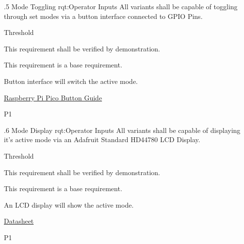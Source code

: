 \ONERQMTVKPP
{\RqtNumberBase.5}
{\ThisSys Mode Toggling}
{rqt:Operator Inputs}
{All \ThisSys variants shall be capable of toggling through set modes via a button interface connected to GPIO Pins.}
{
	\item [All Phases] Threshold
}
{This requirement shall be verified by demonstration.}
{
	\item [N/A] This requirement is a base requirement.
}
{
  \item Button interface will switch the active \GCS mode.
  \item \item \href{https://projects.raspberrypi.org/en/projects/introduction-to-the-pico/10}{Raspberry Pi Pico Button Guide}
}
{P1}

\ONERQMTVKPP
{\RqtNumberBase.6}
{\ThisSys Mode Display}
{rqt:Operator Inputs}
{All \ThisSys variants shall be capable of displaying it's active mode via an Adafruit Standard HD44780 LCD Display.}
{
	\item [All Phases] Threshold
}
{This requirement shall be verified by demonstration.}
{
	\item [N/A] This requirement is a base requirement.
}
{
  \item An LCD display will show the active \GCS mode.
  \item \href{https://cdn-shop.adafruit.com/datasheets/HD44780.pdf}{Datasheet}
}
{P1}
